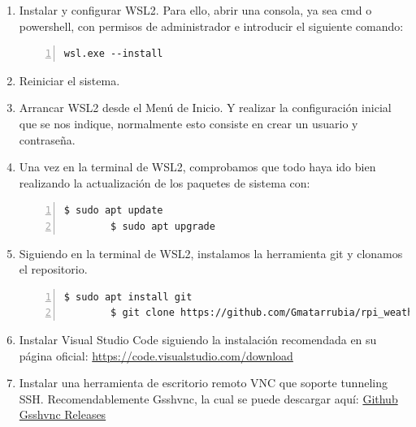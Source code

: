 \begin{enumerate}
    \item Instalar y configurar \gls{WSL2}. Para ello, abrir una consola, ya sea cmd
    o powershell, con permisos de administrador e introducir el siguiente comando:
    \begin{lstlisting}[style=cmd, numbers=left]
        wsl.exe --install
    \end{lstlisting}

    \item Reiniciar el sistema.

    \item Arrancar \gls{WSL2} desde el Menú de Inicio. Y realizar la configuración
    inicial que se nos indique, normalmente esto consiste en crear un usuario y
    contraseña.

    \item Una vez en la terminal de \gls{WSL2}, comprobamos que todo haya ido bien realizando
    la actualización de los paquetes de sistema con:
    \begin{lstlisting}[style=consola, numbers=left]
        $ sudo apt update
        $ sudo apt upgrade
    \end{lstlisting}

    \item Siguiendo en la terminal de \gls{WSL2}, instalamos la herramienta git y clonamos
    el repositorio.
    \begin{lstlisting}[style=consola, numbers=left]
        $ sudo apt install git
        $ git clone https://github.com/Gmatarrubia/rpi_weather.git
    \end{lstlisting}

    \item Instalar Visual Studio Code siguiendo la instalación recomendada en su página
    oficial: \href{https://code.visualstudio.com/download}{https://code.visualstudio.com/download}

    \item Instalar una herramienta de escritorio remoto VNC que soporte tunneling SSH.
    Recomendablemente Gsshvnc, la cual se puede descargar aquí:
    \href{https://github.com/zrax/gsshvnc/releases}{Github Gsshvnc Releases}


\end{enumerate}
